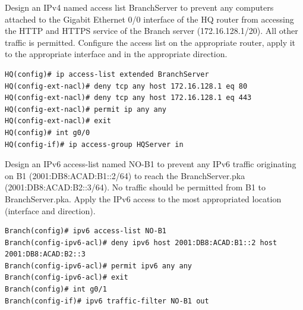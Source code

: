\begin{example}
Design an IPv4 named access list BranchServer to prevent any computers attached to the Gigabit Ethernet 0/0 interface of the HQ router from accessing the HTTP and HTTPS service of the Branch server (172.16.128.1/20). All other traffic is permitted. Configure the access list on the appropriate router, apply it to the appropriate interface and in the appropriate direction.
\begin{verbatim}
HQ(config)# ip access-list extended BranchServer
HQ(config-ext-nacl)# deny tcp any host 172.16.128.1 eq 80
HQ(config-ext-nacl)# deny tcp any host 172.16.128.1 eq 443
HQ(config-ext-nacl)# permit ip any any
HQ(config-ext-nacl)# exit
HQ(config)# int g0/0
HQ(config-if)# ip access-group HQServer in
\end{verbatim}
\end{example}

\begin{example}
 Design an IPv6 access-list named NO-B1 to prevent any IPv6 traffic originating on B1 (2001:DB8:ACAD:B1::2/64) to reach the BranchServer.pka (2001:DB8:ACAD:B2::3/64). No traffic should be permitted from B1 to BranchServer.pka. Apply the IPv6 access to the most appropriated location (interface and direction).
\begin{verbatim}
Branch(config)# ipv6 access-list NO-B1
Branch(config-ipv6-acl)# deny ipv6 host 2001:DB8:ACAD:B1::2 host 2001:DB8:ACAD:B2::3
Branch(config-ipv6-acl)# permit ipv6 any any
Branch(config-ipv6-acl)# exit
Branch(config)# int g0/1
Branch(config-if)# ipv6 traffic-filter NO-B1 out
\end{verbatim}
\end{example}


